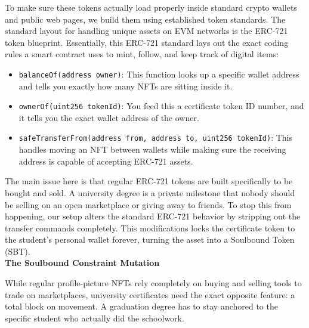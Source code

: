 To make sure these tokens actually load properly inside standard crypto wallets and public web pages, we build them using established token standards\cite{william2018eip721}. The standard layout for handling unique assets on EVM networks is the ERC-721 token blueprint\cite{nfterc721web}\cite{william2018eip721}. Essentially, this ERC-721 standard lays out the exact coding rules a smart contract uses to mint, follow, and keep track of digital items\cite{william2018eip721}\cite{openzeppelin2026erc721}:



\begin{itemize}
    \item \texttt{balanceOf(address owner)}: This function looks up a specific wallet address and tells you exactly how many NFTs are sitting inside it\cite{nfterc721web}.

    \item \texttt{ownerOf(uint256 tokenId)}: You feed this a certificate token ID number, and it tells you the exact wallet address of the owner\cite{nfterc721web}.

    \item \texttt{safeTransferFrom(address from, address to, uint256 tokenId)}: This handles moving an NFT between wallets while making sure the receiving address is capable of accepting ERC-721 assets\cite{nfterc721web}.
\end{itemize}

The main issue here is that regular ERC-721 tokens are built specifically to be bought and sold. A university degree is a private milestone that nobody should be selling on an open marketplace or giving away to friends. To stop this from happening, our setup alters the standard ERC-721 behavior by stripping out the transfer commands completely. This modifications locks the certificate token to the student's personal wallet forever, turning the asset into a Soulbound Token (SBT)\cite{glen2022web3soul}.\\

\textbf{The Soulbound Constraint Mutation}\newline

While regular profile-picture NFTs rely completely on buying and selling tools to trade on marketplaces\cite{nfterc721web}, university certificates need the exact opposite feature: a total block on movement\cite{glen2022web3soul}\cite{ahsan2025shikkachain}. A graduation degree has to stay anchored to the specific student who actually did the schoolwork\cite{glen2022web3soul}.\\

